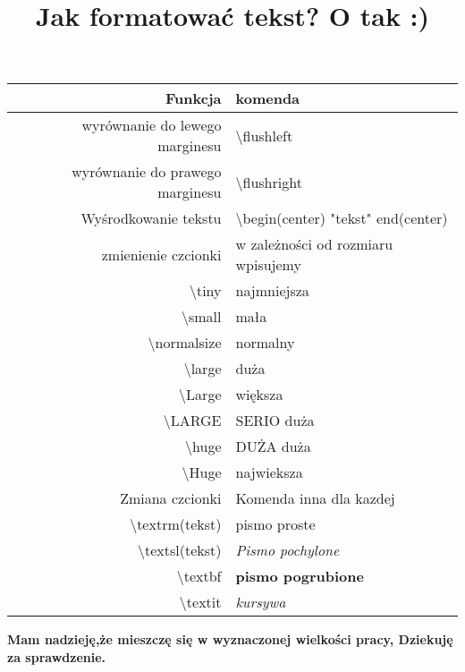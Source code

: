 \documentclass{article}
\begin{document}
\newpage
\begin{center}
\title{\textbf{Jak formatować tekst?} }
\end{center}

\begin{center}
\title{\huge O tak :)}
\maketitle
\end{center}
\begin{center}
\begin{tabular}{|r|l|}
\hline
Funkcja & komenda \\
\hline
wyrównanie do lewego marginesu & \textbackslash flushleft \\
wyrównanie do prawego marginesu & \textbackslash flushright \\
Wyśrodkowanie tekstu & \textbackslash begin(center) "tekst" end(center)\\
zmienienie czcionki & w zależności od rozmiaru wpisujemy \\
\textbackslash tiny & najmniejsza \\
\textbackslash small & mała \\
\textbackslash normalsize & normalny \\
\textbackslash large & duża \\
\textbackslash Large & większa \\
\textbackslash LARGE & SERIO duża \\
\textbackslash huge & DUŻA duża\\
\textbackslash Huge & najwieksza\\
Zmiana czcionki & Komenda inna dla kazdej \\
\textbackslash textrm(tekst) & pismo proste \\
\textbackslash textsl(tekst) & \textsl{Pismo pochylone}\\
\textbackslash textbf & \textbf{pismo pogrubione} \\
\textbackslash textit & \textit{kursywa}\\
\hline


\end{tabular}
\end{center}
\begin{center}
\textbf{Mam nadzieję,że mieszczę się w wyznaczonej wielkości pracy,
Dziekuję za sprawdzenie.}
\end{center}
\end{document}
